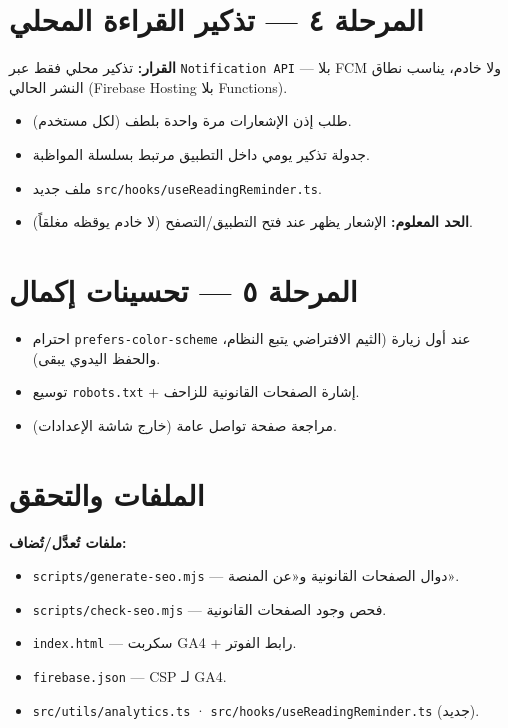 \documentclass[11pt]{article}
\begin{document}
\section{المرحلة ٤ — تذكير القراءة المحلي}

\begin{notebox}
\textbf{القرار:} تذكير محلي فقط عبر \texttt{Notification API} — بلا FCM ولا خادم،
يناسب نطاق النشر الحالي (Firebase Hosting بلا Functions).
\end{notebox}

\begin{itemize}
  \item طلب إذن الإشعارات مرة واحدة بلطف (لكل مستخدم).
  \item جدولة تذكير يومي داخل التطبيق مرتبط بسلسلة المواظبة.
  \item ملف جديد \texttt{src/hooks/useReadingReminder.ts}.
  \item \textbf{الحد المعلوم:} الإشعار يظهر عند فتح التطبيق/التصفح (لا خادم يوقظه مغلقاً).
\end{itemize}

\section{المرحلة ٥ — تحسينات إكمال}

\begin{itemize}
  \item احترام \texttt{prefers-color-scheme} عند أول زيارة (الثيم الافتراضي يتبع النظام، والحفظ اليدوي يبقى).
  \item توسيع \texttt{robots.txt} + إشارة الصفحات القانونية للزاحف.
  \item مراجعة صفحة تواصل عامة (خارج شاشة الإعدادات).
\end{itemize}

\section{الملفات والتحقق}

\textbf{ملفات تُعدَّل/تُضاف:}
\begin{itemize}
  \item \texttt{scripts/generate-seo.mjs} — دوال الصفحات القانونية و«عن المنصة».
  \item \texttt{scripts/check-seo.mjs} — فحص وجود الصفحات القانونية.
  \item \texttt{index.html} — سكربت GA4 + رابط الفوتر.
  \item \texttt{firebase.json} — CSP لـ GA4.
  \item \texttt{src/utils/analytics.ts} · \texttt{src/hooks/useReadingReminder.ts} (جديد).
\end{itemize}
\end{document}
